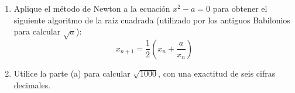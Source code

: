 \setcounter{enumi}{18}
\item \par
\begin{enumerate}
    \item[(a)] Aplique el método de Newton a la ecuación $x^2 - a = 0$ para obtener el siguiente algoritmo de la raíz cuadrada (utilizado por los antiguos Babilonios para calcular $\sqrt{a}$):
    $$x_{n+1} = \frac{1}{2} \left( x_n + \frac{a}{x_n} \right)$$
    \item[(b)] Utilice la parte (a) para calcular $\sqrt{1000}$, con una exactitud de seis cifras decimales.
\end{enumerate}
